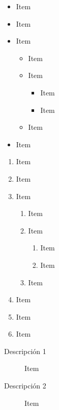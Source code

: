 \documentclass{article}
\begin{document}
\begin{itemize}
  \item Item
  \item Item
  \item Item
    \begin{itemize}
      \item Item
      \item Item
        \begin{itemize}
          \item Item
          \item Item
        \end{itemize}
      \item Item
    \end{itemize}
  \item Item
\end{itemize}

\begin{enumerate}
  \item Item
  \item Item
  \item Item
    \begin{enumerate}
      \item Item
      \item Item
        \begin{enumerate}
          \item Item
          \item Item
        \end{enumerate}
      \item Item
    \end{enumerate}
  \item Item
  \item Item
  \item Item
\end{enumerate}

\begin{description}
  \item[Descripción 1] Item
  \item[Descripción 2] Item
\end{description}
\end{document}
